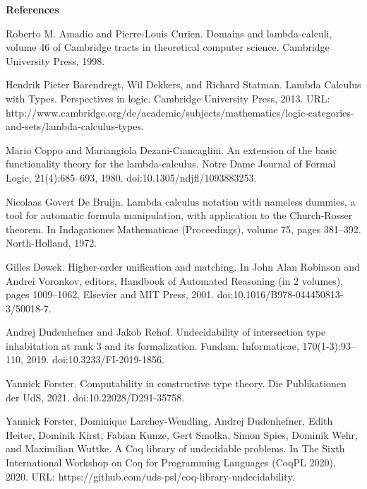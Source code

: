 
 
\par\medskip\noindent\textbf{References}\par
  
\par\noindent  [1]  Roberto M. Amadio and Pierre-Louis Curien.  Domains and lambda-calculi, volume 46 of Cambridge tracts in theoretical computer science.  Cambridge University Press, 1998.  
 
\par\noindent  [2]  Hendrik Pieter Barendregt, Wil Dekkers, and Richard Statman.  Lambda Calculus with Types.  Perspectives in logic. Cambridge University Press, 2013.  URL: http://www.cambridge.org/de/academic/subjects/mathematics/logic-categories-and-sets/lambda-calculus-types.  
 
\par\noindent  [3]  Mario Coppo and Mariangiola Dezani-Ciancaglini.  An extension of the basic functionality theory for the lambda-calculus.  Notre Dame Journal of Formal Logic, 21(4):685–693, 1980.  doi:10.1305/ndjfl/1093883253.  
 
\par\noindent  [4]  Nicolaas Govert De Bruijn.  Lambda calculus notation with nameless dummies, a tool for automatic formula manipulation, with application to the Church-Rosser theorem.  In Indagationes Mathematicae (Proceedings), volume 75, pages 381–392. North-Holland, 1972.  
 
\par\noindent  [5]  Gilles Dowek.  Higher-order unification and matching.  In John Alan Robinson and Andrei Voronkov, editors, Handbook of Automated Reasoning (in 2 volumes), pages 1009–1062. Elsevier and MIT Press, 2001.  doi:10.1016/B978-044450813-3/50018-7.  
 
\par\noindent  [6]  Andrej Dudenhefner and Jakob Rehof.  Undecidability of intersection type inhabitation at rank 3 and its formalization.  Fundam. Informaticae, 170(1-3):93–110, 2019.  doi:10.3233/FI-2019-1856.  
 
\par\noindent  [7]  Yannick Forster.  Computability in constructive type theory.  Die Publikationen der UdS, 2021.  doi:10.22028/D291-35758.  
 
\par\noindent  [8]  Yannick Forster, Dominique Larchey-Wendling, Andrej Dudenhefner, Edith Heiter, Dominik Kirst, Fabian Kunze, Gert Smolka, Simon Spies, Dominik Wehr, and Maximilian Wuttke.  A Coq library of undecidable problems.  In The Sixth International Workshop on Coq for Programming Languages (CoqPL 2020), 2020.  URL: https://github.com/uds-psl/coq-library-undecidability.  
 
